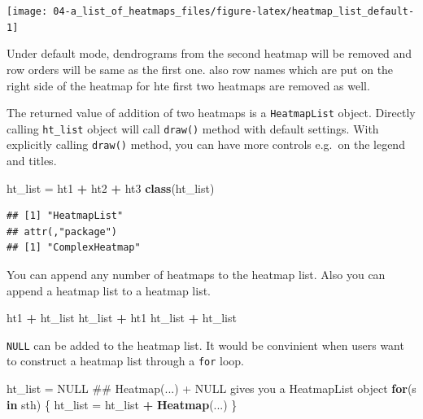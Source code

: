 \documentclass[]{book}
\newenvironment{Shaded}{\begin{snugshade}}{\end{snugshade}}
\newcommand{\KeywordTok}[1]{\textcolor[rgb]{0.13,0.29,0.53}{\textbf{#1}}}
\newcommand{\StringTok}[1]{\textcolor[rgb]{0.31,0.60,0.02}{#1}}
\newcommand{\OtherTok}[1]{\textcolor[rgb]{0.56,0.35,0.01}{#1}}
\newcommand{\ControlFlowTok}[1]{\textcolor[rgb]{0.13,0.29,0.53}{\textbf{#1}}}
\newcommand{\OperatorTok}[1]{\textcolor[rgb]{0.81,0.36,0.00}{\textbf{#1}}}
\newcommand{\NormalTok}[1]{#1}
\theoremstyle{definition}
\theoremstyle{definition}
\theoremstyle{definition}
\theoremstyle{remark}
\begin{document}
\begin{center}\texttt{[image: 04-a\_list\_of\_heatmaps\_files/figure-latex/heatmap\_list\_default-1]} \end{center}

Under default mode, dendrograms from the second heatmap will be removed
and row orders will be same as the first one. also row names which are
put on the right side of the heatmap for hte first two heatmaps are
removed as well.

The returned value of addition of two heatmaps is a \texttt{HeatmapList}
object. Directly calling \texttt{ht\_list} object will call
\texttt{draw()} method with default settings. With explicitly calling
\texttt{draw()} method, you can have more controls e.g.~on the legend
and titles.

\begin{Shaded}
\begin{Highlighting}[]
\NormalTok{ht_list =}\StringTok{ }\NormalTok{ht1 }\OperatorTok{+}\StringTok{ }\NormalTok{ht2 }\OperatorTok{+}\StringTok{ }\NormalTok{ht3}
\KeywordTok{class}\NormalTok{(ht_list)}
\end{Highlighting}
\end{Shaded}

\begin{verbatim}
## [1] "HeatmapList"
## attr(,"package")
## [1] "ComplexHeatmap"
\end{verbatim}

You can append any number of heatmaps to the heatmap list. Also you can
append a heatmap list to a heatmap list.

\begin{Shaded}
\begin{Highlighting}[]
\NormalTok{ht1 }\OperatorTok{+}\StringTok{ }\NormalTok{ht_list}
\NormalTok{ht_list }\OperatorTok{+}\StringTok{ }\NormalTok{ht1}
\NormalTok{ht_list }\OperatorTok{+}\StringTok{ }\NormalTok{ht_list}
\end{Highlighting}
\end{Shaded}

\texttt{NULL} can be added to the heatmap list. It would be convinient
when users want to construct a heatmap list through a \texttt{for} loop.

\begin{Shaded}
\begin{Highlighting}[]
\NormalTok{ht_list =}\StringTok{ }\OtherTok{NULL}\NormalTok{  ## Heatmap(...) + NULL gives you a HeatmapList object}
\ControlFlowTok{for}\NormalTok{(s }\ControlFlowTok{in}\NormalTok{ sth) \{}
\NormalTok{    ht_list =}\StringTok{ }\NormalTok{ht_list }\OperatorTok{+}\StringTok{ }\KeywordTok{Heatmap}\NormalTok{(...)}
\NormalTok{\}}
\end{Highlighting}
\end{Shaded}
\end{document}
